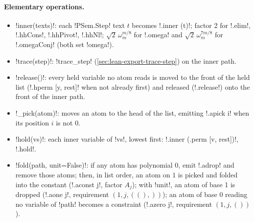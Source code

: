 {{{\paragraph{Elementary operations.}
\begin{itemize}
\item \lexpy!inner(texts)!: each \lexlean!PSem.Step! text $t$ becomes \lexlean!.inner (t)!; factor 2
for \lexlean!.elim!, \lexlean!.hhCons!, \lexlean!.hhPivot!, \lexlean!.hhNl!; $\sqrt2\,\omega_m^{m/8}$ for
\lexlean!.omega! and $\sqrt2\,\omega_m^{7m/8}$ for \lexlean!.omegaConj! (both set \lexpy!omega!).
\item \lexpy!trace(step)!: \lexpy!trace_step! (\cref{sec:lean-export-trace-step}) on the inner path.
\item \lexpy!release()!: every held variable no atom reads is moved to the front of the held list
(\lexlean!.hperm [y, rest]! when not already first) and released (\lexlean!.release!) onto the front
of the inner path.
\item \lexpy!_pick(atom)!: moves an atom to the head of the list, emitting \lexlean!.apick i! when its
position $i$ is not 0.
\item \lexpy!hold(vs)!: each inner variable of \lexcode!vs!, lowest first: \lexlean!.inner (.perm [v, rest])!,
\lexlean!.hold!.
\item \lexpy!fold(path, unit=False)!: if any atom has polynomial 0, emit \lexlean!.adrop! and remove
those atoms; then, in list order, an atom on $1$ is picked and folded into the constant
(\lexlean!.aconst j!, factor $A_j$); with \lexcode!unit!, an atom of base 1 is dropped
(\lexlean!.aone j!, requirement $(1, j, ((),))$); an atom of base 0 reading no variable of
\lexcode!path! becomes a constraint (\lexlean!.azero j!, requirement $(1, j, ())$).
\end{itemize}

}}}
